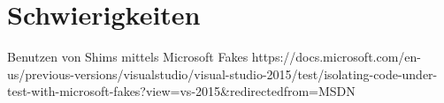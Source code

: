 \section{Schwierigkeiten}
Benutzen von Shims mittels Microsoft Fakes
https://docs.microsoft.com/en-us/previous-versions/visualstudio/visual-studio-2015/test/isolating-code-under-test-with-microsoft-fakes?view=vs-2015&redirectedfrom=MSDN